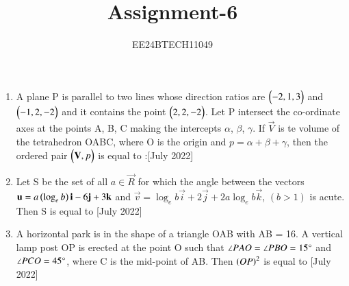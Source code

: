\documentclass[journal,12pt,onecolumn]{IEEEtran}
\theoremstyle{remark}
\begin{document}

\vspace{3cm}

\title{Assignment-6}
\author{EE24BTECH11049}
{\let\newpage\relax\maketitle}

\renewcommand{\thefigure}{\theenumi}
\renewcommand{\thetable}{\theenumi}
\begin{enumerate}
	\item A plane P is parallel to two lines whose direction ratios are $\begin{pmatrix}-2,1,3\end{pmatrix}$ and $\begin{pmatrix}-1,2,-2\end{pmatrix}$ and it contains the point $\begin{pmatrix}2,2,-2\end{pmatrix}$. Let P intersect the co-ordinate axes at the points A, B, C making the intercepts $\alpha$, $\beta$, $\gamma$. If $\vec{V}$ is te volume of the tetrahedron OABC, where O is the origin and $p=\alpha + \beta + \gamma$, then the ordered pair $\begin{pmatrix}\mathbf{V}, p\end{pmatrix}$ is equal to :\hfill{[July 2022]}
		\begin{enumerate}
		\end{enumerate}
	\item Let S be the set of all $ a \in \vec{R}$ for which the angle between the vectors $\mathbf{u} = a\left(\log_{e}{b}\right)\mathbf{i} -6\mathbf{j} + 3\mathbf{k}$ and $\vec{v} = \log_{e}{b}\vec{i} + 2\vec{j} + 2a\log_{e}{b}\vec{k}$, $(b>1)$ is acute. Then S is equal to \hfill{[July 2022]}
		\begin{enumerate}
				\begin{multicols}{4}
				\item $\brak{-\infty, -\frac{4}{3}}$
				\item $ \phi $
				\item $\brak{-\frac{4}{3}, 0}$
				\item $\brak{\frac{12}{7}, \infty}$
				\end{multicols}
		\end{enumerate}
	\item A horizontal park is in the shape of a triangle OAB with AB = 16. A vertical lamp post OP is erected at the point O such that $\angle{PAO} = \angle{PBO} = 15 \degree$ and $\angle{PCO} = 45\degree$, where C is the mid-point of AB. Then $\left(OP\right)^2$ is equal to \hfill{[July 2022]}

\end{enumerate}
\end{document}
